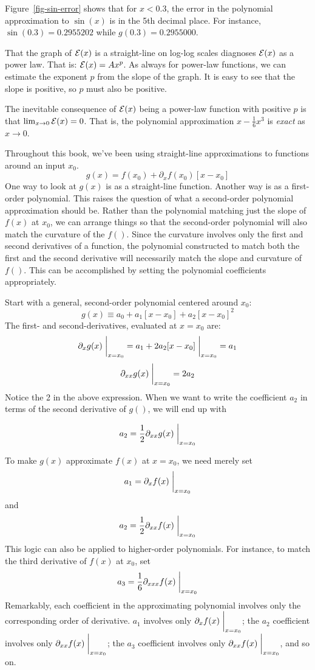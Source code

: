 \documentclass[
  letterpaper,
  DIV=11,
  numbers=noendperiod,
  oneside]{scrreprt}
\begin{document}
Figure~\ref{fig-sin-error} shows that for \(x < 0.3\), the error in the
polynomial approximation to \(\sin(x)\) is in the 5th decimal place. For
instance, \(\sin(0.3) = 0.2955202\) while \(g(0.3) = 0.2955000\).

That the graph of \({\cal E}(x)\) is a straight-line on log-log scales
diagnoses \({\cal E}(x)\) as a power law. That is:
\({\cal E}(x) = A x^p\). As always for power-law functions, we can
estimate the exponent \(p\) from the slope of the graph. It is easy to
see that the slope is positive, so \(p\) must also be positive.

The inevitable consequence of \({\cal E}(x)\) being a power-law function
with positive \(p\) is that \(\lim_{x\rightarrow 0} {\cal E}(x) = 0\).
That is, the polynomial approximation \(x - \frac{1}{6}x^3\) is
\emph{exact} as \(x \rightarrow 0\).

Throughout this book, we've been using straight-line approximations to
functions around an input \(x_0\).
\[g(x) = f(x_0) + \partial_x f(x_0) [x-x_0]\] One way to look at
\(g(x)\) is as a straight-line function. Another way is as a first-order
polynomial. This raises the question of what a second-order polynomial
approximation should be. Rather than the polynomial matching just the
slope of \(f(x)\) at \(x_0\), we can arrange things so that the
second-order polynomial will also match the curvature of the \(f()\).
Since the curvature involves only the first and second derivatives of a
function, the polynomial constructed to match both the first and the
second derivative will necessarily match the slope and curvature of
\(f()\). This can be accomplished by setting the polynomial coefficients
appropriately.

Start with a general, second-order polynomial centered around \(x_0\):
\[g(x) \equiv a_0 + a_1 [x-x_0] + a_2 [x - x_0]^2\] The first- and
second-derivatives, evaluated at \(x=x_0\) are:
\[\partial_x g(x)\left.{\Large\strut}\right|_{x=x_0} = a_1 + 2 a_2 [x  - x_0] \left.{\Large\strut}\right|_{x=x_0} = a_1\]
\[\partial_{xx} g(x)\left.{\Large\strut}\right|_{x=x_0} =  2 a_2\]
Notice the 2 in the above expression. When we want to write the
coefficient \(a_2\) in terms of the second derivative of \(g()\), we
will end up with

\[a_2 = \frac{1}{2} \partial_{xx} g(x)\left.{\Large\strut}\right|_{x=x_0}\]

To make \(g(x)\) approximate \(f(x)\) at \(x=x_0\), we need merely set
\[a_1 = \partial_x f(x)\left.{\Large\strut}\right|_{x=x_0}\] and
\[a_2 = \frac{1}{2} \partial_{xx} f(x) \left.{\Large\strut}\right|_{x=x_0}\]
This logic can also be applied to higher-order polynomials. For
instance, to match the third derivative of \(f(x)\) at \(x_0\), set
\[a_3 = \frac{1}{6} \partial_{xxx} f(x)  \left.{\Large\strut}\right|_{x=x_0}\]
Remarkably, each coefficient in the approximating polynomial involves
only the corresponding order of derivative. \(a_1\) involves only
\(\partial_x f(x) \left.{\Large\strut}\right|_{x=x_0}\); the \(a_2\)
coefficient involves only
\(\partial_{xx} f(x) \left.{\Large\strut}\right|_{x=x_0}\); the \(a_3\)
coefficient involves only
\(\partial_{xx} f(x) \left.{\Large\strut}\right|_{x=x_0}\), and so on.
\end{document}
